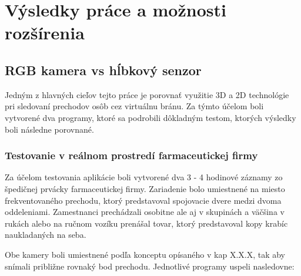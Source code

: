\chapter{Výsledky práce a možnosti rozšírenia}
\section{RGB kamera vs hĺbkový senzor}
Jedným z hlavných cieľov tejto práce je porovnať využitie 3D a 2D technológie pri sledovaní prechodov osôb cez virtuálnu bránu. Za týmto účelom boli vytvorené dva programy, ktoré sa podrobili dôkladným testom, ktorých výsledky boli následne porovnané. 

\subsection{Testovanie v reálnom prostredí farmaceutickej firmy}
Za účelom testovania aplikácie boli vytvorené dva 3 - 4 hodinové záznamy zo špedičnej prvácky farmaceutickej firmy. Zariadenie bolo umiestnené na miesto frekventovaného prechodu, ktorý predstavoval spojovacie dvere medzi dvoma oddeleniami. Zamestnanci prechádzali osobitne ale aj v skupinách a väčšina v rukách alebo na ručnom vozíku prenášal tovar, ktorý predstavoval kopy krabíc naukladaných na seba. 

Obe kamery boli umiestnené podľa konceptu opísaného v kap X.X.X, tak aby snímali približne rovnaký bod prechodu. Jednotlivé programy uspeli nasledovne:  

